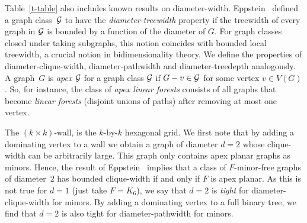 \documentclass[runningheads,envcountsame]{llncs}
\begin{document}
 Table~\ref{t-table} also includes known results on diameter-width. Eppstein~\cite{Ep00} defined a graph class~${\cal G}$ to have the {\it diameter-treewidth} property if the treewidth of every graph in ${\cal G}$ is bounded by a function of the diameter of $G$. For graph classes closed under taking subgraphs, this notion coincides with bounded local treewidth, a crucial notion in bidimensionality theory. We define the properties of diameter-clique-width, diameter-pathwidth and diameter-treedepth analogously. A graph~$G$ is {\it apex ${\cal G}$} for a graph class ${\cal G}$ if $G-v\in {\cal G}$ for some vertex $v\in V(G)$. So, for instance, the class of {\it apex linear forests} consists of all graphs that become {\it linear forests} (disjoint unions of paths) after removing at most one vertex.
 
  The $(k \times k)$-wall, is the $k$-by-$k$ hexagonal grid.
  We first note that by adding a dominating vertex to a wall we obtain a graph of diameter $d=2$ whose clique-width can be arbitrarily large. This graph only contains apex planar graphs as minors. Hence, 
  the result of Eppstein~\cite{Ep00} implies that
  a class of $F$-minor-free graphs of diameter~$2$ has bounded clique-width if and only if $F$ is apex planar. As this is not true for $d=1$ (just take $F=K_6$), we say that $d=2$ is {\it tight} for diameter-clique-width for minors.  
  By adding a dominating vertex to a 
  full binary tree, we find that $d=2$ is also tight for
 diameter-pathwidth for minors.
\end{document}

